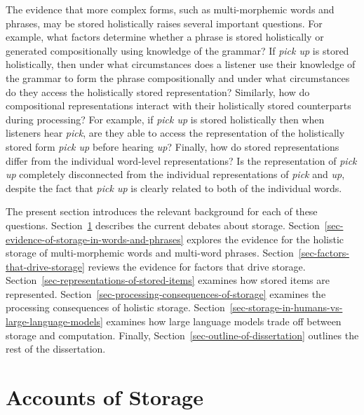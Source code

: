 \documentclass[
  12pt,
  letterpaper,
]{scrreprt}
\begin{document}
The evidence that more complex forms, such as multi-morphemic words and
phrases, may be stored holistically raises several important questions.
For example, what factors determine whether a phrase is stored
holistically or generated compositionally using knowledge of the
grammar? If \emph{pick up} is stored holistically, then under what
circumstances does a listener use their knowledge of the grammar to form
the phrase compositionally and under what circumstances do they access
the holistically stored representation? Similarly, how do compositional
representations interact with their holistically stored counterparts
during processing? For example, if \emph{pick up} is stored holistically
then when listeners hear \emph{pick}, are they able to access the
representation of the holistically stored form \emph{pick up} before
hearing \emph{up}? Finally, how do stored representations differ from
the individual word-level representations? Is the representation of
\emph{pick up} completely disconnected from the individual
representations of \emph{pick} and \emph{up}, despite the fact that
\emph{pick up} is clearly related to both of the individual words.

The present section introduces the relevant background for each of these
questions. Section~\ref{sec-accounts-of-storage} describes the current
debates about storage.
Section~\ref{sec-evidence-of-storage-in-words-and-phrases} explores the
evidence for the holistic storage of multi-morphemic words and
multi-word phrases. Section~\ref{sec-factors-that-drive-storage} reviews
the evidence for factors that drive storage.
Section~\ref{sec-representations-of-stored-items} examines how stored
items are represented.
Section~\ref{sec-processing-consequences-of-storage} examines the
processing consequences of holistic storage.
Section~\ref{sec-storage-in-humans-vs-large-language-models} examines
how large language models trade off between storage and computation.
Finally, Section~\ref{sec-outline-of-dissertation} outlines the rest of
the dissertation.

\section{Accounts of Storage}\label{sec-accounts-of-storage}
\end{document}
